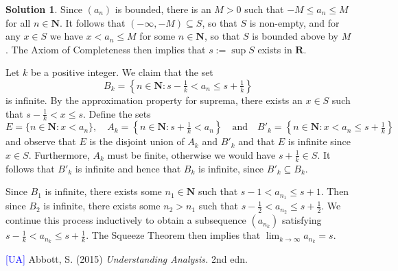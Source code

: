 \documentclass[12pt]{article}
\theoremstyle{definition}
\theoremstyle{exercise}
\theoremstyle{solution}
\newtheorem*{solution}{Solution}
\newcommand{\N}{\mathbf{N}}
\newcommand{\R}{\mathbf{R}}
\begin{document}
\begin{solution}
    Since \( (a_n) \) is bounded, there is an \( M > 0 \) such that \( -M \leq a_n \leq M \) for all \( n \in \N \). It follows that \( (-\infty, -M) \subseteq S \), so that \( S \) is non-empty, and for any \( x \in S \) we have \( x < a_n \leq M \) for some \( n \in \N \), so that \( S \) is bounded above by \( M \). The Axiom of Completeness then implies that \( s := \sup S \) exists in \( \R \).

    Let \( k \) be a positive integer. We claim that the set
    \[
        B_k = \left\{ n \in \N : s - \tfrac{1}{k} < a_n \leq s + \tfrac{1}{k} \right\}
    \]
    is infinite. By the approximation property for suprema, there exists an \( x \in S \) such that \( s - \tfrac{1}{k} < x \leq s \). Define the sets
    \[
        E = \{ n \in \N : x < a_n \}, \quad A_k = \left\{ n \in \N : s + \tfrac{1}{k} < a_n \right\} \quad \text{and} \quad B'_k = \left\{ n \in \N : x < a_n \leq s + \tfrac{1}{k} \right\}
    \]
    and observe that \( E \) is the disjoint union of \( A_k \) and \( B'_k \) and that \( E \) is infinite since \( x \in S \). Furthermore, \( A_k \) must be finite, otherwise we would have \( s + \tfrac{1}{k} \in S \). It follows that \( B'_k \) is infinite and hence that \( B_k \) is infinite, since \( B'_k \subseteq B_k \).

    Since \( B_1 \) is infinite, there exists some \( n_1 \in \N \) such that \( s - 1 < a_{n_1} \leq s + 1 \). Then since \( B_2 \) is infinite, there exists some \( n_2 > n_1 \) such that \( s - \tfrac{1}{2} < a_{n_2} \leq s + \tfrac{1}{2} \). We continue this process inductively to obtain a subsequence \( (a_{n_k}) \) satisfying \( s - \tfrac{1}{k} < a_{n_k} \leq s + \tfrac{1}{k} \). The Squeeze Theorem then implies that \( \lim_{k \to \infty} a_{n_k} = s \).
\end{solution}

\noindent \hrulefill

\noindent \hypertarget{ua}{\textcolor{blue}{[UA]} Abbott, S. (2015) \textit{Understanding Analysis.} 2nd edn.}
\end{document}
